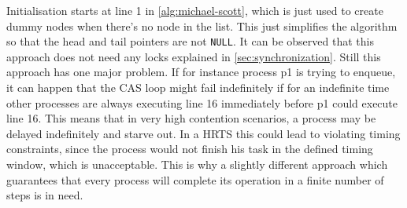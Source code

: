 Initialisation starts at line 1 in \cref{alg:michael-scott}, which is just used to create dummy nodes when there's no node in the list. This just simplifies the algorithm so that the head and tail pointers are not \texttt{NULL}. It can be observed that this approach does not need any locks explained in \cref{sec:synchronization}. Still this approach has one major problem. If for instance process p1 is trying to enqueue, it can happen that the \ac{CAS} loop might fail indefinitely if for an indefinite time other processes are always executing line 16 immediately before p1 could execute line 16. This means that in very high contention scenarios, a process may be delayed indefinitely and starve out. In a \ac{HRTS} this could lead to violating timing constraints, since the process would not finish his task in the defined timing window, which is unacceptable. This is why a slightly different approach which guarantees that every process will complete its operation in a finite number of steps is in need. \cite{MichaelScottQueue}

